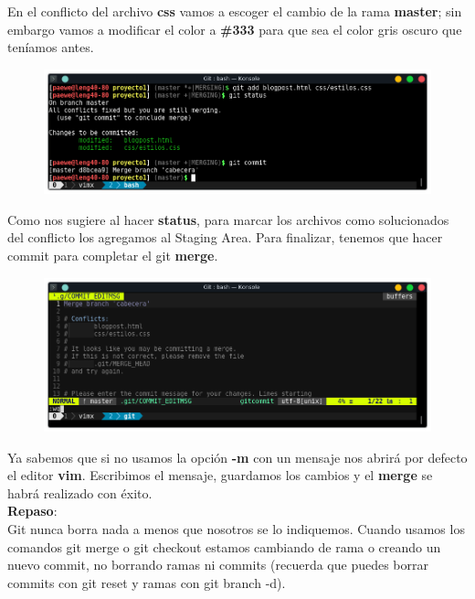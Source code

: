 \documentclass{article}
\begin{document}
En el conflicto del archivo \textbf{css} vamos a escoger el cambio de la rama
\textbf{master}; sin embargo vamos a modificar el color a \textbf{\#333} para
que sea el color gris oscuro que teníamos antes.

\begin{figure}[h!]
  \centering
  \includegraphics[scale=0.75]{./Pictures/182_mergin_ok.png}
\end{figure}

Como nos sugiere al hacer \textbf{status}, para marcar los archivos como
solucionados del conflicto los agregamos al Staging Area. Para finalizar,
tenemos que hacer commit para completar el git \textbf{merge}.

\newpage

\begin{figure}[h!]
  \centering
  \includegraphics[scale=0.75]{./Pictures/183_commit.png}
\end{figure}

Ya sabemos que si no usamos la opción \textbf{-m} con un mensaje nos abrirá por
defecto el editor \textbf{vim}. Escribimos el mensaje, guardamos los cambios y
el \textbf{merge} se habrá realizado con éxito.\\

\textbf{Repaso}:\\

Git nunca borra nada a menos que nosotros se lo indiquemos. Cuando usamos los
comandos git merge o git checkout estamos cambiando de rama o creando un nuevo
commit, no borrando ramas ni commits (recuerda que puedes borrar commits con
git reset y ramas con git branch -d).\\
\end{document}

